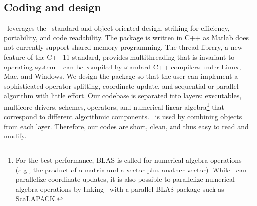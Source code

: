 \subsection{Coding and design}
\pkg~leverages the \cpp~standard and object oriented design, striking for efficiency, portability, and code readability. The package is written in C++ as Matlab does not currently support shared memory programming. The thread library, a new feature of the C++11 standard, provides multithreading that is invariant to operating system. \pkg~can be compiled by standard C++ compilers  under Linux, Mac, and Windows. We design the package so that the user can implement a sophisticated operator-splitting, coordinate-update, and sequential or parallel algorithm  with little effort. Our codebase is separated into layers: executables, multicore drivers, schemes, operators, and numerical linear algebra\footnote{For the best performance, BLAS is called for numerical algebra operations (e.g., the product of a matrix and a vector plus another vector). While \pkg~can parallelize coordinate updates, it is also possible to parallelize numerical algebra operations by linking \pkg~with a parallel BLAS package such as ScaLAPACK\citep{blackford1997scalapack}.}  that correspond to different algorithmic components. \pkg~is used by combining objects from each layer.
Therefore, our codes  are short, clean, and thus easy to read and modify.




